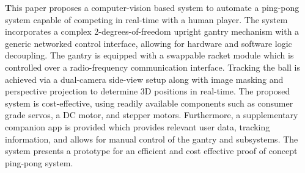 \textbf
This paper proposes a computer-vision based system to automate a ping-pong system capable of competing in real-time with a human player. The system incorporates a complex 2-degrees-of-freedom upright gantry mechanism with a generic networked control interface, allowing for hardware and software logic decoupling. The gantry is equipped with a swappable racket module which is controlled over a radio-frequency communication interface. Tracking the ball is achieved via a dual-camera side-view setup along with image masking and perspective projection to determine 3D positions in real-time. The proposed system is cost-effective, using readily available components such as consumer grade servos, a DC motor, and stepper motors. Furthermore, a supplementary companion app is provided which provides relevant user data, tracking information, and allows for manual control of the gantry and subsystems. The system presents a prototype for an efficient and cost effective proof of concept ping-pong system.